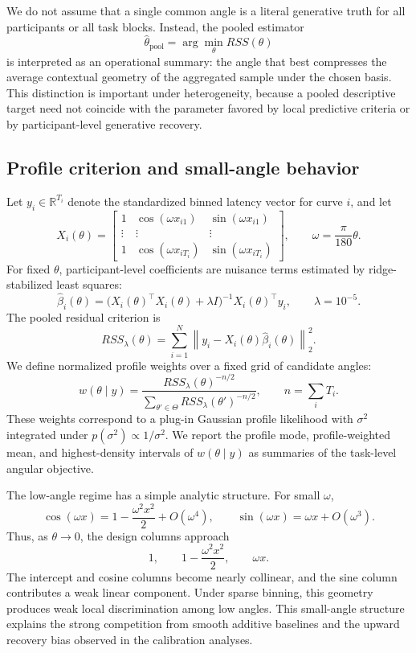 \documentclass[12pt]{article}
\begin{document}
We do not assume that a single common angle is a literal generative truth for all participants or all task blocks. Instead, the pooled estimator
\[
\hat{\theta}_{\mathrm{pool}}=\arg\min_\theta RSS(\theta)
\]
is interpreted as an operational summary: the angle that best compresses the average contextual geometry of the aggregated sample under the chosen basis. This distinction is important under heterogeneity, because a pooled descriptive target need not coincide with the parameter favored by local predictive criteria or by participant-level generative recovery.

\subsection{Profile criterion and small-angle behavior}

Let $y_i \in \mathbb{R}^{T_i}$ denote the standardized binned latency vector for curve \(i\), and let
\[
X_i(\theta)=
\begin{bmatrix}
1 & \cos(\omega x_{i1}) & \sin(\omega x_{i1})\\
\vdots & \vdots & \vdots\\
1 & \cos(\omega x_{iT_i}) & \sin(\omega x_{iT_i})
\end{bmatrix},
\qquad \omega=\frac{\pi}{180}\theta .
\]
For fixed $\theta$, participant-level coefficients are nuisance terms estimated by ridge-stabilized least squares:
\[
\hat{\beta}_i(\theta)=
\bigl(X_i(\theta)^\top X_i(\theta)+\lambda I\bigr)^{-1}
X_i(\theta)^\top y_i,
\qquad \lambda=10^{-5}.
\]
The pooled residual criterion is
\[
RSS_\lambda(\theta)=
\sum_{i=1}^N
\left\|y_i-X_i(\theta)\hat{\beta}_i(\theta)\right\|_2^2 .
\]
We define normalized profile weights over a fixed grid of candidate angles:
\[
w(\theta\mid y)=
\frac{RSS_\lambda(\theta)^{-n/2}}
{\sum_{\theta'\in\Theta}RSS_\lambda(\theta')^{-n/2}},
\qquad n=\sum_i T_i .
\]
These weights correspond to a plug-in Gaussian profile likelihood with \(\sigma^2\) integrated under \(p(\sigma^2)\propto 1/\sigma^2\). We report the profile mode, profile-weighted mean, and highest-density intervals of \(w(\theta\mid y)\) as summaries of the task-level angular objective.

The low-angle regime has a simple analytic structure. For small \(\omega\),
\[
\cos(\omega x)=1-\frac{\omega^2 x^2}{2}+O(\omega^4), \qquad
\sin(\omega x)=\omega x+O(\omega^3).
\]
Thus, as $\theta \to 0$, the design columns approach
\[
1,\qquad 1-\frac{\omega^2 x^2}{2},\qquad \omega x.
\]
The intercept and cosine columns become nearly collinear, and the sine column contributes a weak linear component. Under sparse binning, this geometry produces weak local discrimination among low angles. This small-angle structure explains the strong competition from smooth additive baselines and the upward recovery bias observed in the calibration analyses.
\end{document}
